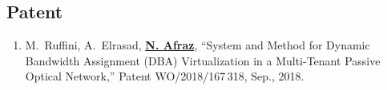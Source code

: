  \subsection{Patent}
    \begin{enumerate}
    \item M.~Ruffini, A.~Elrasad, \textbf{\underline{N. {Afraz}}}, ``System and {Method} for {Dynamic} {Bandwidth} {Assignment} (DBA) {Virtualization} in a {Multi}-{Tenant} {Passive} {Optical} {Network},'' Patent WO/2018/167\,318, Sep., 2018.
    \end{enumerate}


% 
% 



%     
%     
